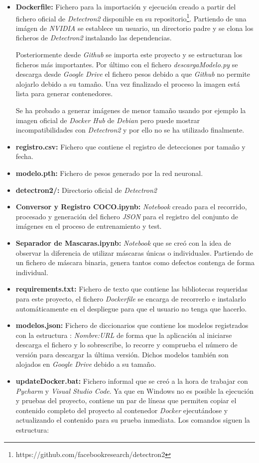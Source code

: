 \begin{itemize}
    \item \textbf{Dockerfile:} Fichero para la importación y ejecución creado a partir del fichero oficial de \emph{Detectron2} disponible en su repositorio\footnote{https://github.com/facebookresearch/detectron2}. 
    Partiendo de una imágen de \emph{NVIDIA} se establece un usuario, un directorio padre y se clona los ficheros de \emph{Detectron2} instalando las dependencias. 
    
    Posteriormente desde \emph{Github} se importa este proyecto y se estructuran los ficheros más importantes. Por último con el fichero \emph{descargaModelo.py} se descarga desde \emph{Google Drive} el fichero pesos debido a que \emph{Github} no permite alojarlo debido a su tamaño. Una vez finalizado el proceso la imagen está lista para generar contenedores.
    
    Se ha probado a generar imágenes de menor tamaño usando por ejemplo la imagen oficial de \emph{Docker Hub} de \emph{Debian} pero puede mostrar incompatibilidades con \emph{Detectron2} y por ello no se ha utilizado finalmente.
    
    \item \textbf{registro.csv:} Fichero que contiene el registro de detecciones por tamaño y fecha.
    \item \textbf{modelo.pth:} Fichero de pesos generado por la red neuronal.
    \item \textbf{detectron2/:} Directorio oficial de \emph{Detectron2}
    \item \textbf{Conversor y Registro COCO.ipynb:} \emph{Notebook} creado para el recorrido, procesado y generación del fichero \emph{JSON} para el registro del conjunto de imágenes en el proceso de entrenamiento y test.
    \item \textbf{Separador de Mascaras.ipynb:} \emph{Notebook} que se creó con la idea de observar la diferencia de utilizar máscaras únicas o individuales. Partiendo de un fichero de máscara binaria, genera tantos como defectos contenga de forma individual.
    \item \textbf{requirements.txt:} Fichero de texto que contiene las bibliotecas requeridas para este proyecto, el fichero \emph{Dockerfile} se encarga de recorrerlo e instalarlo automáticamente en el despliegue para que el usuario no tenga que hacerlo.
    \item \textbf{modelos.json:} Fichero de diccionarios que contiene los modelos registrados con la estructura : \emph{Nombre:URL} de forma que la aplicación al iniciarse descarga el fichero y lo sobrescribe, lo recorre y comprueba el número de versión para descargar la última versión. Dichos modelos también son alojados en \emph{Google Drive} debido a su tamaño.
    \item \textbf{updateDocker.bat:} Fichero informal que se creó a la hora de trabajar con \emph{Pycharm} y \emph{Visual Studio Code}. Ya que en Windows no es posible la ejecución y pruebas del proyecto, contiene un par de líneas que permiten copiar el contenido completo del proyecto al contenedor \emph{Docker} ejecutándose y actualizando el contenido para su prueba inmediata.
    Los comandos siguen la estructura: 
    

\end{itemize}
